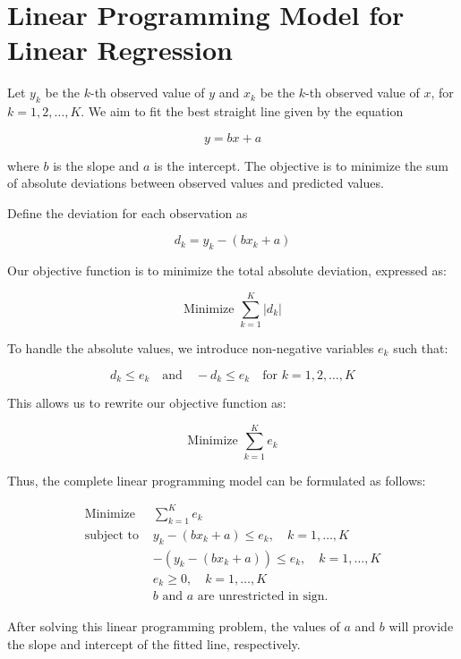 \documentclass{article}
\begin{document}
\section*{Linear Programming Model for Linear Regression}

Let \( y_k \) be the \( k \)-th observed value of \( y \) and \( x_k \) be the \( k \)-th observed value of \( x \), for \( k = 1, 2, \ldots, K \). We aim to fit the best straight line given by the equation

\[
y = bx + a
\]

where \( b \) is the slope and \( a \) is the intercept. The objective is to minimize the sum of absolute deviations between observed values and predicted values.

Define the deviation for each observation as

\[
d_k = y_k - (bx_k + a)
\]

Our objective function is to minimize the total absolute deviation, expressed as:

\[
\text{Minimize } \sum_{k=1}^{K} |d_k|
\]

To handle the absolute values, we introduce non-negative variables \( e_k \) such that:

\[
d_k \leq e_k \quad \text{and} \quad -d_k \leq e_k \quad \text{for } k = 1, 2, \ldots, K
\]

This allows us to rewrite our objective function as:

\[
\text{Minimize } \sum_{k=1}^{K} e_k
\]

Thus, the complete linear programming model can be formulated as follows:

\begin{align*}
\text{Minimize } & \sum_{k=1}^{K} e_k \\
\text{subject to } & y_k - (bx_k + a) \leq e_k, \quad k = 1, \ldots, K \\
& -(y_k - (bx_k + a)) \leq e_k, \quad k = 1, \ldots, K \\
& e_k \geq 0, \quad k = 1, \ldots, K \\
& b \text{ and } a \text{ are unrestricted in sign.}
\end{align*}

After solving this linear programming problem, the values of \( a \) and \( b \) will provide the slope and intercept of the fitted line, respectively.
\end{document}
